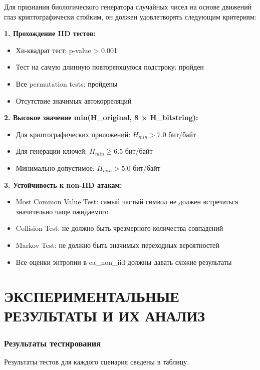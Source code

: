\documentclass[14pt, a4paper]{extreport}
\let\oldchapter\chapter
\renewcommand{\chapter}{%
  \setcounter{subsection}{0}%
  \oldchapter%
}
\begin{document}
Для признания биологического генератора случайных чисел на основе движений глаз криптографически стойким, он должен удовлетворять следующим критериям:

\textbf{1. Прохождение IID тестов:}
\begin{itemize}
    \item Хи-квадрат тест: p-value > 0.001
    \item Тест на самую длинную повторяющуюся подстроку: пройден
    \item Все permutation tests: пройдены
    \item Отсутствие значимых автокорреляций
\end{itemize}

\textbf{2. Высокое значение min(H\_original, 8 × H\_bitstring):}
\begin{itemize}
    \item Для криптографических приложений: $H_{min} > 7.0$ бит/байт
    \item Для генерации ключей: $H_{min} \geq 6.5$ бит/байт
    \item Минимально допустимое: $H_{min} > 5.0$ бит/байт
\end{itemize}

\textbf{3. Устойчивость к non-IID атакам:}
\begin{itemize}
    \item Most Common Value Test: самый частый символ не должен встречаться значительно чаще ожидаемого
    \item Collision Test: не должно быть чрезмерного количества совпадений
    \item Markov Test: не должно быть значимых переходных вероятностей
    \item Все оценки энтропии в ea\_non\_iid должны давать схожие результаты
\end{itemize}

\newpage
\chapter{ЭКСПЕРИМЕНТАЛЬНЫЕ РЕЗУЛЬТАТЫ И ИХ АНАЛИЗ}

\subsection{Результаты тестирования}

Результаты тестов для каждого сценария сведены в таблицу.
\end{document}
